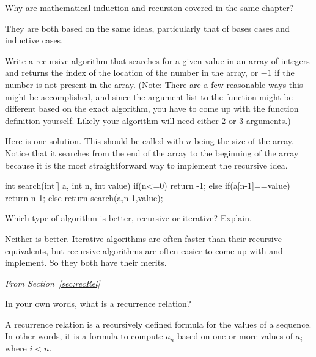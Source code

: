 \begin{requ}
Why are mathematical induction and recursion covered in the same chapter?
\begin{requanswer}
They are both based on the same ideas, particularly that of bases cases and inductive cases.
\end{requanswer}
\end{requ}

\begin{requ}\label{requ:seqSearch}
Write a recursive algorithm that searches for a given value in an array of integers and
returns the index of the location of the number in the array, or $-1$ if the number is not present in the array.
(Note: There are a few reasonable ways this might be accomplished, and since the argument list to the
function might be different based on the exact algorithm, you have to come up with the function
definition yourself. Likely your algorithm will need either 2 or 3 arguments.)
\begin{requanswer}
Here is one solution. 
This should be called with $n$ being the size of the array.
Notice that it searches from the end of the array to the beginning of the array
because it is the most straightforward way to implement the recursive idea.
\begin{code}
int search(int[] a, int n, int value) {
    if(n<=0) {
        return -1;
    } else if(a[n-1]==value) {
       return n-1;
    } else {
        return search(a,n-1,value);
    }
}
\end{code}
\end{requanswer}
\end{requ}

\begin{requ}
Which type of algorithm is better, recursive or iterative? Explain.
\begin{requanswer}
Neither is better. Iterative algorithms are often faster than their recursive equivalents,
but recursive algorithms are often easier to come up with and implement.
So they both have their merits.
\end{requanswer}
\end{requ}


\noindent
{\em From Section~\ref{sec:recRel}}

\begin{requ}
In your own words, what is a recurrence relation?
\begin{requanswer}
A recurrence relation is a recursively defined formula for the values of a sequence.
In other words, it is a formula to compute $a_n$ based on one or more values of $a_i$
where $i<n$.
\end{requanswer}
\end{requ}


